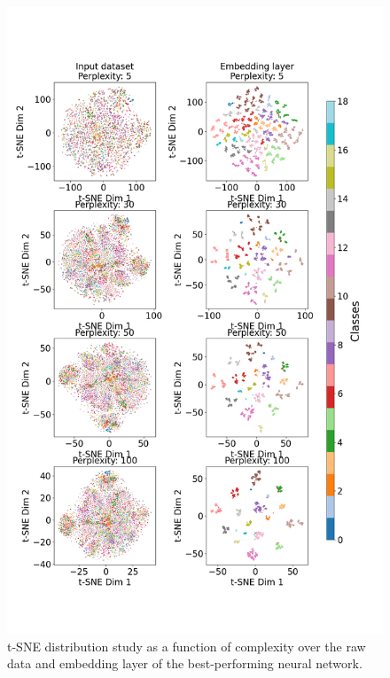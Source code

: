 \documentclass[11pt,a4paper]{article}
\begin{document}
\begin{figure}[htb]
    \centering
    \includegraphics[width=\columnwidth, keepaspectratio]{../tsne.png}
    \caption{t-SNE distribution study as a function of complexity over the raw data and embedding layer of the best-performing neural network.}\label{fig:tsne}
\end{figure}
\end{document}
